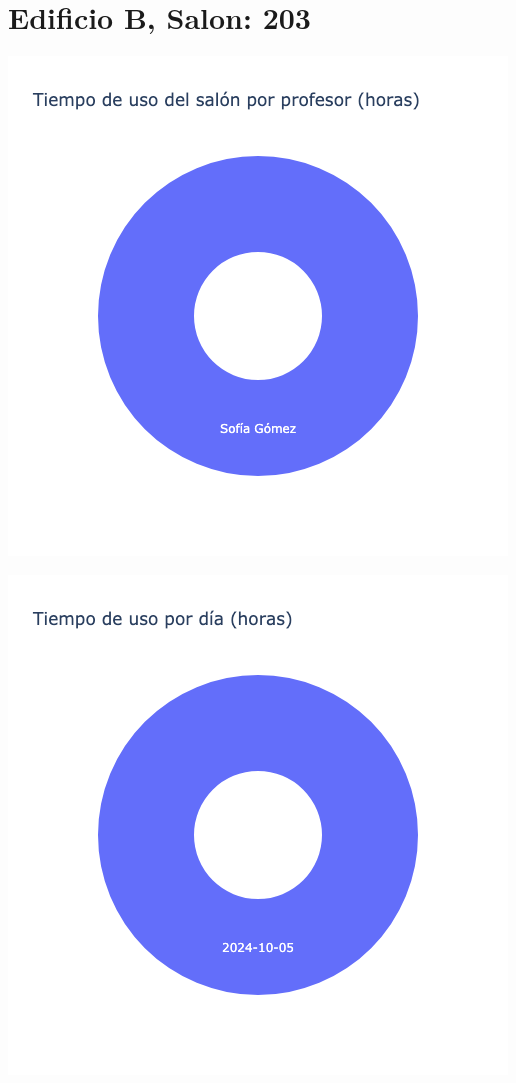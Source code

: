\documentclass{article}
\begin{document}
    \section{Edificio B, Salon: 203}
    \noindent
    \begin{minipage}{0.48\textwidth}
        \centering
        \includegraphics[width=\textwidth]{../img/pie/UP203-90Dias-03-12-2024.png}
    \end{minipage}
    \hfill
    \begin{minipage}{0.48\textwidth}
        \centering
        \includegraphics[width=\textwidth]{../img/pie/UD203-90Dias-03-12-2024.png}
    \end{minipage}
    
\end{document}
